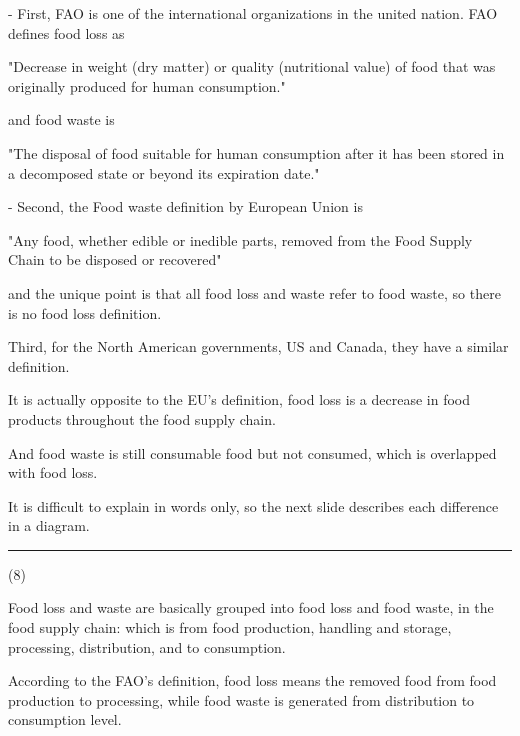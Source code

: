 \documentclass{article}
\begin{document}
\begin{multicols}{2}
\begin{spacing}{1.1}
\vspace{1em}
- First, FAO is one of the international organizations in the united nation.
FAO defines food loss as

"Decrease in weight (dry matter) or quality (nutritional value) of food that was originally produced for human consumption."

and food waste is 

"The disposal of food suitable for human consumption after it has been stored in a decomposed state or beyond its expiration date."

\vspace{1em}

- Second, the Food waste definition by European Union is 

"Any food, whether edible or inedible parts, removed from the Food Supply Chain to be disposed or recovered"

and the unique point is that all food loss and waste refer to food waste, 
so there is no food loss definition.

\vspace{1em}

Third, for the North American governments, US and Canada, 
they have a similar definition.

It is actually opposite to the EU's definition,
food loss is a decrease in food products throughout the food supply chain.

And food waste is still consumable food but not consumed, which is overlapped with food loss.

\vspace{1em}

It is difficult to explain in words only, 
so the next slide describes each difference in a diagram.

\noindent\rule{0.1\textwidth}{1pt}\small(8)

Food loss and waste are basically grouped into food loss and food waste, 
in the food supply chain: 
which is from food production, handling and storage, processing, distribution, and to consumption.

\vspace{1em}

According to the FAO's definition, 
food loss means the removed food from food production to processing, 
while food waste is generated from distribution to consumption level.


\end{spacing}
\end{multicols}
\end{document}
